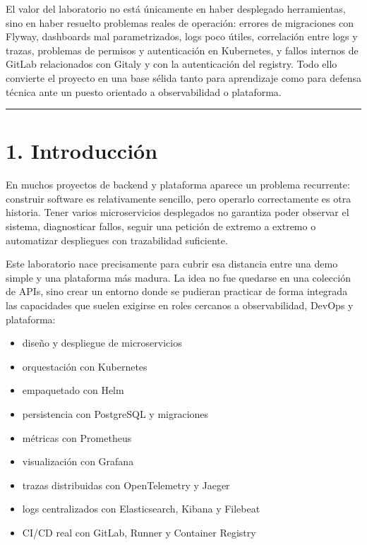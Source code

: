 \documentclass[
a4paper,
12pt]{report}
\providecommand{\tightlist}{%
  \setlength{\itemsep}{0pt}\setlength{\parskip}{0pt}}
\begin{document}
El valor del laboratorio no está únicamente en haber desplegado
herramientas, sino en haber resuelto problemas reales de operación:
errores de migraciones con Flyway, dashboards mal parametrizados, logs
poco útiles, correlación entre logs y trazas, problemas de permisos y
autenticación en Kubernetes, y fallos internos de GitLab relacionados
con Gitaly y con la autenticación del registry. Todo ello convierte el
proyecto en una base sélida tanto para aprendizaje como para defensa
técnica ante un puesto orientado a observabilidad o plataforma.

\begin{center}\rule{0.5\linewidth}{0.5pt}\end{center}

\chapter{1. Introducción}\label{introducciuxf3n}

En muchos proyectos de backend y plataforma aparece un problema
recurrente: construir software es relativamente sencillo, pero operarlo
correctamente es otra historia. Tener varios microservicios desplegados
no garantiza poder observar el sistema, diagnosticar fallos, seguir una
petición de extremo a extremo o automatizar despliegues con trazabilidad
suficiente.

Este laboratorio nace precisamente para cubrir esa distancia entre una
demo simple y una plataforma más madura. La idea no fue quedarse en una
colección de APIs, sino crear un entorno donde se pudieran practicar de
forma integrada las capacidades que suelen exigirse en roles cercanos a
observabilidad, DevOps y plataforma:

\begin{itemize}
\tightlist
\item
  diseño y despliegue de microservicios
\item
  orquestación con Kubernetes
\item
  empaquetado con Helm
\item
  persistencia con PostgreSQL y migraciones
\item
  métricas con Prometheus
\item
  visualización con Grafana
\item
  trazas distribuidas con OpenTelemetry y Jaeger
\item
  logs centralizados con Elasticsearch, Kibana y Filebeat
\item
  CI/CD real con GitLab, Runner y Container Registry
\end{itemize}
\end{document}
